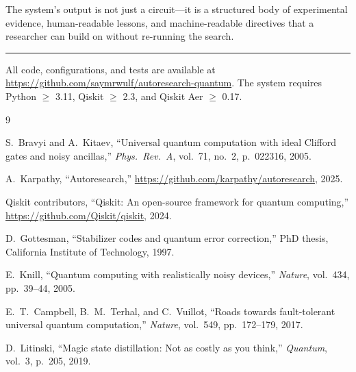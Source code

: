 \documentclass[11pt,a4paper]{article}
\begin{document}
The system's output is not just a circuit---it is a structured body of
experimental evidence, human-readable lessons, and machine-readable directives
that a researcher can build on without re-running the search.

\vspace{1em}
\hrule
\vspace{0.5em}
{\small All code, configurations, and tests are available at
\url{https://github.com/saymrwulf/autoresearch-quantum}. The system requires
Python $\geq$ 3.11, Qiskit $\geq$ 2.3, and Qiskit Aer $\geq$ 0.17.}

\begin{thebibliography}{9}

S.~Bravyi and A.~Kitaev,
``Universal quantum computation with ideal Clifford gates and noisy ancillas,''
\emph{Phys.\ Rev.\ A}, vol.~71, no.~2, p.~022316, 2005.

A.~Karpathy,
``Autoresearch,''
\url{https://github.com/karpathy/autoresearch}, 2025.

Qiskit contributors,
``Qiskit: An open-source framework for quantum computing,''
\url{https://github.com/Qiskit/qiskit}, 2024.

D.~Gottesman,
``Stabilizer codes and quantum error correction,''
PhD thesis, California Institute of Technology, 1997.

E.~Knill,
``Quantum computing with realistically noisy devices,''
\emph{Nature}, vol.~434, pp.~39--44, 2005.

E.~T.~Campbell, B.~M.~Terhal, and C.~Vuillot,
``Roads towards fault-tolerant universal quantum computation,''
\emph{Nature}, vol.~549, pp.~172--179, 2017.

D.~Litinski,
``Magic state distillation: Not as costly as you think,''
\emph{Quantum}, vol.~3, p.~205, 2019.

\end{thebibliography}
\end{document}
